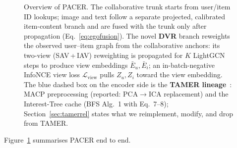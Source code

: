 \documentclass[conference]{IEEEtran}
\newcommand{\Lcal}{\mathcal{L}}
\newcommand{\dvr}{DVR\xspace}
\begin{document}
\begin{figure}[t]
{%
}
\caption{Overview of PACER. The collaborative trunk starts
from user/item ID lookups; image and text follow a separate projected,
calibrated item-content branch and are fused with the trunk only after
propagation (Eq.~\ref{eq:egofusion}). The novel \textbf{\dvr} branch
reweights the observed user--item graph from the collaborative anchors:
its two-view (SAV\,+\,IAV) reweighting is propagated
for $K$ LightGCN steps to
produce view embeddings $\bar E_u, \bar E_i$; an in-batch-negative
InfoNCE view loss $\Lcal_{\text{view}}$ pulls $Z_u,Z_i$ toward the
view embedding. The blue dashed box on the encoder
side is the \textbf{TAMER lineage}~\cite{meng2025tamer}: MACP
preprocessing (reported: PCA$\to$ICA replacement) and the Interest-Tree cache
(BFS Alg.~1 with Eq.~7--8); Section~\ref{sec:tamerrel} states what
we reimplement, modify, and drop from TAMER.}
\label{fig:overall}
\end{figure}

Figure~\ref{fig:overall} summarises PACER end to end.
\end{document}
